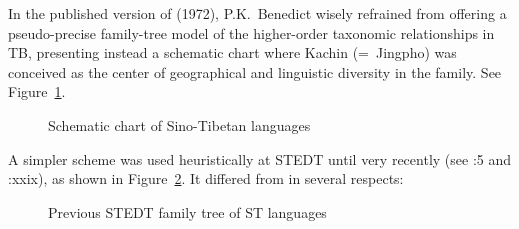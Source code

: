 In the published version of \textit{} (1972),
P.K.\ Benedict wisely refrained from offering a pseudo-precise family-tree model of
the higher-order taxonomic relationships in TB, presenting instead a schematic
chart where Kachin (=~Jingpho) was conceived as the center of geographical and
linguistic diversity in the family. See Figure~\ref{fig:STC_tree}.

\begin{figure}[ht]
\centering
\caption{Schematic chart of Sino-Tibetan languages\protect\footnotemark}
\label{fig:STC_tree}
\end{figure}

A simpler scheme was used heuristically at STEDT until very recently (see \textit{}:5 and \textit{}:xxix), as shown in Figure~\ref{fig:STEDT_tree}. It differed from \textit{} in several respects:

\begin{figure}[ht]
\centering
\caption{Previous STEDT family tree of ST languages}
\label{fig:STEDT_tree}
\end{figure}

